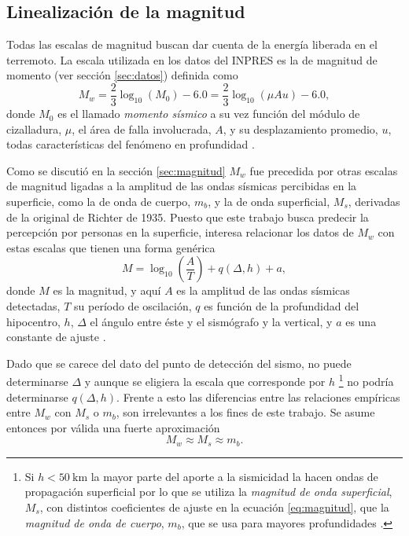 \documentclass[a4paper]{report}
\begin{document}
\subsection{Linealización de la magnitud}\label{sec:linealización}
Todas las escalas de magnitud buscan dar cuenta de la energía liberada en el terremoto.
La escala utilizada en los datos del INPRES es la de magnitud de momento (ver sección \ref{sec:datos}) definida como \cite[ec. 4.23]{fowler_solid_1990}
\begin{equation}
	M_w =
	\frac{2}{3} \log_{10} \left( M_0 \right) - 6.0 = 
	\frac{2}{3} \log_{10} \left( \mu A u \right) - 6.0,
	\label{eq:momento}
\end{equation}
donde \(M_0\) es el llamado \emph{momento sísmico} a su vez función del módulo de cizalladura, \(\mu\), el área de falla involucrada, \(A\), y su desplazamiento promedio, \(u\), todas características del fenómeno en profundidad \cite*[sección 4.2.4]{fowler_solid_1990}.

Como se discutió en la sección \ref{sec:magnitud} \(M_w\) fue precedida por otras escalas de magnitud ligadas a la amplitud de las ondas sísmicas percibidas en la superficie, como la de onda de cuerpo, \(m_b\), y la de onda superficial, \(M_s\), derivadas de la original de Richter de 1935.
Puesto que este trabajo busca predecir la percepción por personas en la superficie, interesa relacionar los datos de \(M_w\) con estas escalas que tienen una forma genérica
\begin{equation}
	M = \log_{10} \left( \frac{A}{T} \right) + q(\Delta, h) + a,
	\label{eq:magnitud}
\end{equation}
donde \(M\) es la magnitud, y aquí \(A\) es la amplitud de las ondas sísmicas detectadas, \(T\) su período de oscilación, \(q\) es función de la profundidad del hipocentro, \(h\), \(\Delta\) el ángulo entre éste y el sismógrafo y la vertical, y \(a\) es una constante de ajuste \cite[ecuación 4.13]{fowler_solid_1990}.

Dado que se carece del dato del punto de detección del sismo, no puede determinarse \(\Delta\) y aunque se eligiera la escala que corresponde por \(h\) \footnote{Si \(h< \SI{50}{\kilo\metre}\) la mayor parte del aporte a la sismicidad la hacen ondas de propagación superficial por lo que se utiliza la \emph{magnitud de onda superficial}, \(M_s\), con distintos coeficientes de ajuste en la ecuación \ref{eq:magnitud}, que la \emph{magnitud de onda de cuerpo}, \(m_b\), que se usa para mayores profundidades \cite[sección 4.2.3]{fowler_solid_1990}.} no podría determinarse \(q(\Delta, h)\).
Frente a esto las diferencias entre las relaciones empíricas entre \(M_w\) con \(M_s\) o \(m_b\)\cite{hanks_moment_1979}, son irrelevantes a los fines de este trabajo.
Se asume entonces por válida una fuerte aproximación
\begin{equation}
	M_w \approx M_s \approx m_b.
	\label{eq:igualdad}
\end{equation}
\end{document}
